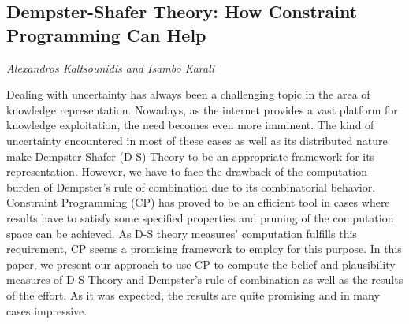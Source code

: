 \documentclass[../booklet.tex]{subfiles}
\begin{document}
\subsection[Dempster-Shafer Theory: How Constraint Programming Can Help. {\it Alexandros Kaltsounidis and Isambo Karali}]{Dempster-Shafer Theory: How Constraint Programming Can Help}
 

\begin{center}
  {\it Alexandros Kaltsounidis and Isambo Karali}
\end{center}

\vskip 0.8cm

Dealing with uncertainty has always been a challenging topic in the area of knowledge representation. Nowadays, as the internet provides a vast platform for knowledge exploitation, the need becomes even more imminent. The kind of uncertainty encountered in most of these cases as well as its distributed nature make Dempster-Shafer (D-S) Theory to be an appropriate framework for its representation. However, we have to face the drawback of the computation burden of Dempster's rule of combination due to its combinatorial behavior. Constraint Programming (CP) has proved to be an efficient tool in cases where results have to satisfy some specified properties and pruning of the computation space can be achieved. As D-S theory measures' computation fulfills this requirement, CP seems a promising framework to employ for this purpose. In this paper, we present our approach to use CP to compute the belief and plausibility measures of D-S Theory and Dempster's rule of combination as well as the results of the effort. As it was expected, the results are quite promising and in many cases impressive.

\end{document}
